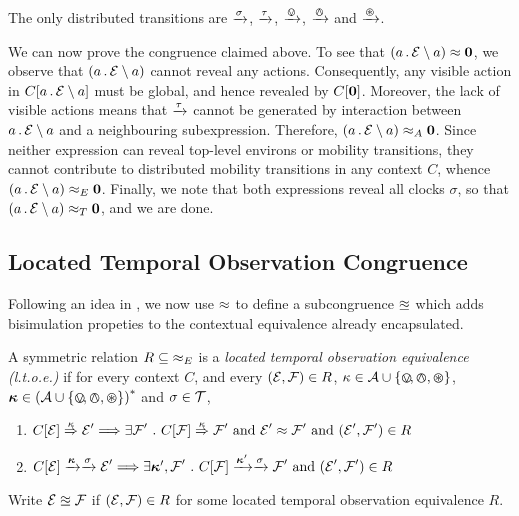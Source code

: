 \documentclass[orivec,envcountsame]{llncs}
\begin{document}
\begin{proposition}
The only distributed transitions are $\xrightarrow{\sigma}$, $\xrightarrow{\tau}$,
$\xrightarrow{\varovee}$, $\xrightarrow{\varowedge}$ and $\xrightarrow{\varoast}$.
\end{proposition}

We can now prove the congruence claimed above. To see that $\left(a\,.\,\text{$\mathcal{E}$}
\setminus {a}\right) \approx \textbf{0}$, we observe that $\left(a\,.\,\text{$\mathcal{E}$} \setminus {a}\right)$
cannot reveal any actions. Consequently, any visible action in $C[a\,.\,\text{$\mathcal{E}$}
\setminus {a}]$ must be global, and hence revealed by $C[\textbf{0}]$. Moreover, the lack of
visible actions means that $\xrightarrow{\tau}$ cannot be generated by interaction
between $a\,.\,\text{$\mathcal{E}$} \setminus {a}$ and a neighbouring subexpression. Therefore,
$\left(a\,.\,\text{$\mathcal{E}$} \setminus {a}\right) \mathrel{\approx_{A}} \textbf{0}$. Since neither expression can
reveal top-level environs or mobility transitions, they cannot contribute to
distributed mobility transitions in any context $C$, whence $\left(a\,.\,\text{$\mathcal{E}$}
\setminus {a}\right) \mathrel{\approx_{E}} \textbf{0}$. Finally, we note that both expressions reveal all
clocks $\sigma$, so that $\left(a\,.\,\text{$\mathcal{E}$} \setminus {a}\right) \mathrel{\approx_{T}} \textbf{0}$, and we
are done.


\subsection{Located Temporal Observation Congruence}
\label{sec:ltoc}

Following an idea in \cite{case}, we now use $\approx$ to define a
subcongruence $\approxeq$ which adds bisimulation propeties to the
contextual equivalence already encapsulated.

\begin{definition}

A symmetric relation $R\mathrel{\subseteq}\mathop{\mathrel{\approx_{E}}}$ is a
\emph{located temporal observation equivalence (l.t.o.e.)} if for every
context $C$, and every $(\text{$\mathcal{E}$},\text{$\mathcal{F}$}) \in R$, $\kappa \in \text{$\mathcal{A}$} \cup
\{ \varovee\!, \varowedge , \varoast \}$, $\vec{\kappa} \in \left(\actions \cup
\{ \tntin, \tntout, \tntopen \}\right)^*$ and $\sigma \in \text{$\mathcal{T}$}$,

\begin{enumerate}
\item
    $C[\text{$\mathcal{E}$}] \stackrel{\kappa}{\Rightarrow} \text{$\mathcal{E}$}' \Longrightarrow 
       \exists \text{$\mathcal{F}$}' ~.~ C[\text{$\mathcal{F}$}] \stackrel{\kappa}{\Rightarrow} \text{$\mathcal{F}$}' \mbox{ and } \text{$\mathcal{E}$}' \approx \text{$\mathcal{F}$}' \mbox{ and } (\text{$\mathcal{E}$}', \text{$\mathcal{F}$}') \in R$ 
\item
    $C[\expr] \Does{\vec{\kappa}}\Does{\sigma} \expr' \Longrightarrow
       \exists \vec{\kappa}', \exprb' ~.~ 
       C[\exprb] \Does{\vec{\kappa}'}\Does{\sigma} \exprb' \mbox{ and } (\expr', \exprb') \in R$
\end{enumerate}
Write $\text{$\mathcal{E}$} \approxeq \text{$\mathcal{F}$}$ if $(\text{$\mathcal{E}$},\text{$\mathcal{F}$}) \in R$ for some located temporal observation
equivalence $R$.
\end{definition}
\end{document}
